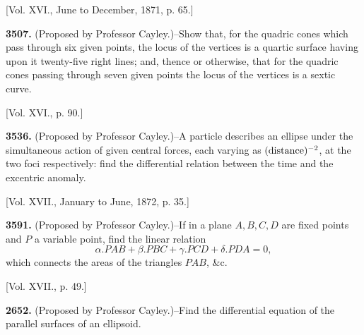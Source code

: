\documentclass[10pt]{article}
\begin{document}
\begin{center}
[Vol. XVI., June to December, 1871, p. 65.]
\end{center}

\noindent
\textbf{3507.} (Proposed by Professor Cayley.)--Show that, for the quadric
cones which pass through six given points, the locus of the vertices is a
quartic surface having upon it twenty-five right lines; and, thence or
otherwise, that for the quadric cones passing through seven given points the
locus of the vertices is a sextic curve.

\begin{center}
[Vol. XVI., p. 90.]
\end{center}

\noindent
\textbf{3536.} (Proposed by Professor Cayley.)--A particle describes an ellipse
under the simultaneous action of given central forces, each varying as
$(\hbox{distance})^{-2}$, at the two foci respectively: find the differential
relation between the time and the excentric anomaly.

\begin{center}
[Vol. XVII., January to June, 1872, p. 35.]
\end{center}

\noindent
\textbf{3591.} (Proposed by Professor Cayley.)--If in a plane $A,B,C,D$ are
fixed points and $P$ a variable point, find the linear relation
\[
        \alpha.PAB+\beta.PBC+\gamma.PCD+\delta.PDA=0,
\]
which connects the areas of the triangles $PAB$, \&c.

\begin{center}
[Vol. XVII., p. 49.]
\end{center}

\noindent
\textbf{2652.} (Proposed by Professor Cayley.)--Find the differential equation
of the parallel surfaces of an ellipsoid.
\normalsize
\end{document}
